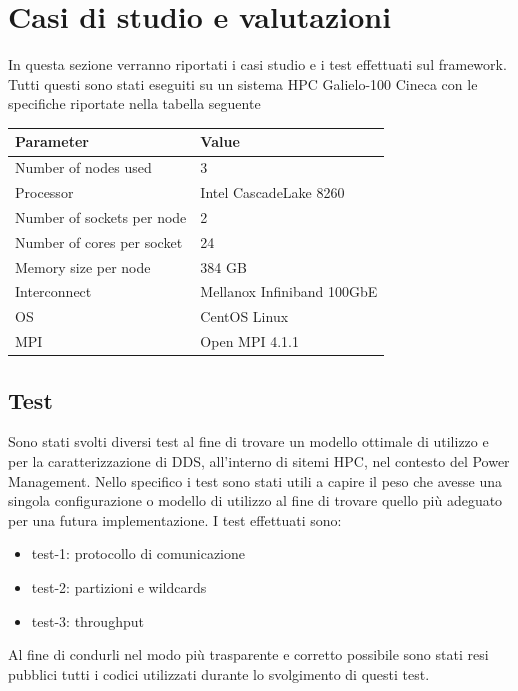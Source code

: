 \chapter{Casi di studio e valutazioni}
In questa sezione verranno riportati i casi studio e i test effettuati sul framework. Tutti questi sono stati eseguiti su un sistema HPC Galielo-100 Cineca con le specifiche riportate nella tabella seguente

\vspace{.7cm}
\begin{center}
\begin{tabular}{l|l}
    \hline
    \textbf{Parameter} & \textbf{Value} \\
    \hline
    Number of nodes used & 3 \\
    \hline
    Processor & Intel CascadeLake 8260 \\
    \hline
    Number of sockets per node & 2 \\
    \hline
    Number of cores per socket & 24 \\
    \hline
    Memory size per node & 384 GB \\
    \hline
    Interconnect & Mellanox Infiniband 100GbE \\
    \hline
    OS & CentOS Linux \\ 
    \hline
    MPI & Open MPI  4.1.1 \\
    \hline
\end{tabular}
\label{table:hpc}
\end{center}

\section{Test}
Sono stati svolti diversi test al fine di trovare un modello ottimale di utilizzo e per la caratterizzazione di DDS, all'interno di sitemi HPC, nel contesto del Power Management. Nello specifico i test sono stati utili a capire il peso che avesse una singola configurazione o modello di utilizzo al fine di trovare quello più adeguato per una futura implementazione. I test effettuati sono:

\begin{itemize}
    \item test-1: protocollo di comunicazione
    \item test-2: partizioni e wildcards
    \item test-3: throughput
\end{itemize}


Al fine di condurli nel modo più trasparente e corretto possibile sono stati resi pubblici \cite{mygit} tutti i codici utilizzati durante lo svolgimento di questi test. %

